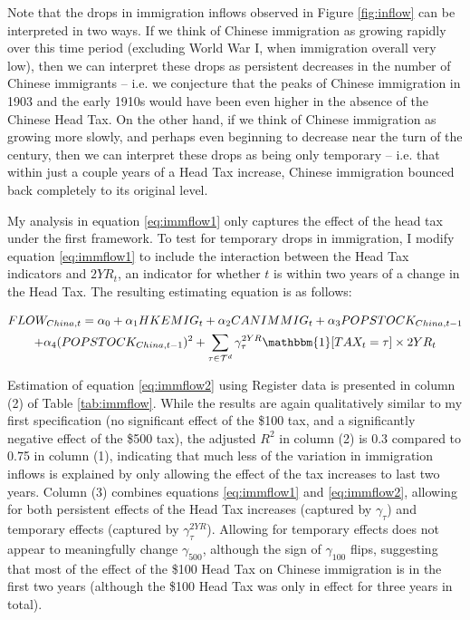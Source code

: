 Note that the drops in immigration inflows observed in Figure \ref{fig:inflow} can be interpreted in two ways. If we think of Chinese immigration as growing rapidly over this time period (excluding World War I, when immigration overall very low), then we can interpret these drops as persistent decreases in the number of Chinese immigrants -- i.e. we conjecture that the peaks of Chinese immigration in 1903 and the early 1910s would have been even higher in the absence of the Chinese Head Tax. On the other hand, if we think of Chinese immigration as growing more slowly, and perhaps even beginning to decrease near the turn of the century, then we can interpret these drops as being only temporary -- i.e. that within just a couple years of a Head Tax increase, Chinese immigration bounced back completely to its original level.

My analysis in equation \eqref{eq:immflow1} only captures the effect of the head tax under the first framework. To test for temporary drops in immigration, I modify equation \eqref{eq:immflow1} to include the interaction between the Head Tax indicators and $2YR_t$, an indicator for whether $t$ is within two years of a change in the Head Tax. The resulting estimating equation is as follows: 

\begin{multline}
    \label{eq:immflow2}
    FLOW_{China,t} = \alpha_0 + \alpha_1 HKEMIG_t + \alpha_2 CANIMMIG_t + \alpha_3 POPSTOCK_{China, t-1} \\ + \alpha_4 (POPSTOCK_{China, t-1})^2 + \sum_{\tau \in \mathcal{T}^d} \gamma^{2YR}_\tau \mathbbm{1}[TAX_t = \tau]\times 2YR_t
\end{multline}

Estimation of equation \eqref{eq:immflow2} using Register data is presented in column (2) of Table \ref{tab:immflow}. While the results are again qualitatively similar to my first specification (no significant effect of the \$100 tax, and a significantly negative effect of the \$500 tax), the adjusted $R^2$ in column (2) is 0.3 compared to 0.75 in column (1), indicating that much less of the variation in immigration inflows is explained by only allowing the effect of the tax increases to last two years. Column (3) combines equations \eqref{eq:immflow1} and \eqref{eq:immflow2}, allowing for both persistent effects of the Head Tax increases (captured by $\gamma_{\tau}$) and temporary effects (captured by $\gamma_{\tau}^{2YR}$). 
Allowing for temporary effects does not appear to meaningfully change $\gamma_{500}$, although the sign of $\gamma_{100}$ flips, suggesting that most of the effect of the \$100 Head Tax on Chinese immigration is in the first two years (although the \$100 Head Tax was only in effect for three years in total).

